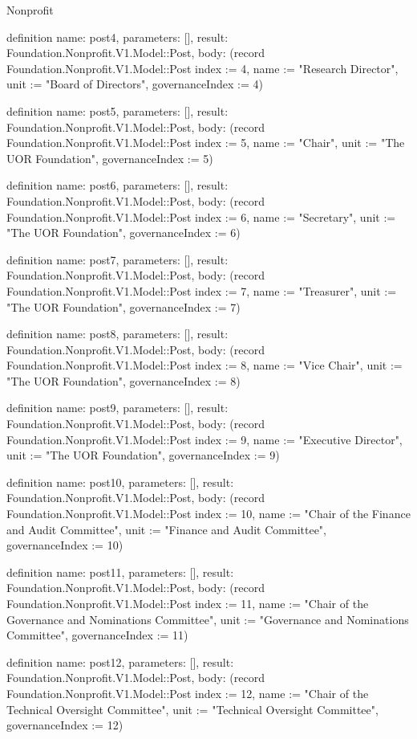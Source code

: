 \begin{lexlean}{Nonprofit}
\begin{semanticmodule}
definition{
  name: post4,
  parameters: [],
  result: Foundation.Nonprofit.V1.Model::Post,
  body: (record Foundation.Nonprofit.V1.Model::Post {index := 4, name := "Research Director", unit := "Board of Directors", governanceIndex := 4})
}

definition{
  name: post5,
  parameters: [],
  result: Foundation.Nonprofit.V1.Model::Post,
  body: (record Foundation.Nonprofit.V1.Model::Post {index := 5, name := "Chair", unit := "The UOR Foundation", governanceIndex := 5})
}

definition{
  name: post6,
  parameters: [],
  result: Foundation.Nonprofit.V1.Model::Post,
  body: (record Foundation.Nonprofit.V1.Model::Post {index := 6, name := "Secretary", unit := "The UOR Foundation", governanceIndex := 6})
}

definition{
  name: post7,
  parameters: [],
  result: Foundation.Nonprofit.V1.Model::Post,
  body: (record Foundation.Nonprofit.V1.Model::Post {index := 7, name := "Treasurer", unit := "The UOR Foundation", governanceIndex := 7})
}

definition{
  name: post8,
  parameters: [],
  result: Foundation.Nonprofit.V1.Model::Post,
  body: (record Foundation.Nonprofit.V1.Model::Post {index := 8, name := "Vice Chair", unit := "The UOR Foundation", governanceIndex := 8})
}

definition{
  name: post9,
  parameters: [],
  result: Foundation.Nonprofit.V1.Model::Post,
  body: (record Foundation.Nonprofit.V1.Model::Post {index := 9, name := "Executive Director", unit := "The UOR Foundation", governanceIndex := 9})
}

definition{
  name: post10,
  parameters: [],
  result: Foundation.Nonprofit.V1.Model::Post,
  body: (record Foundation.Nonprofit.V1.Model::Post {index := 10, name := "Chair of the Finance and Audit Committee", unit := "Finance and Audit Committee", governanceIndex := 10})
}

definition{
  name: post11,
  parameters: [],
  result: Foundation.Nonprofit.V1.Model::Post,
  body: (record Foundation.Nonprofit.V1.Model::Post {index := 11, name := "Chair of the Governance and Nominations Committee", unit := "Governance and Nominations Committee", governanceIndex := 11})
}

definition{
  name: post12,
  parameters: [],
  result: Foundation.Nonprofit.V1.Model::Post,
  body: (record Foundation.Nonprofit.V1.Model::Post {index := 12, name := "Chair of the Technical Oversight Committee", unit := "Technical Oversight Committee", governanceIndex := 12})
}


\end{semanticmodule}
\end{lexlean}
